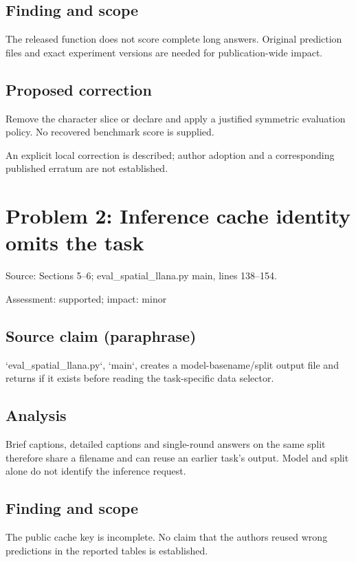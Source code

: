 \documentclass[11pt]{article}
\begin{document}
\subsection*{Finding and scope}

The released function does not score complete long answers. Original prediction files and exact experiment versions are needed for publication-wide impact.

\subsection*{Proposed correction}

Remove the character slice or declare and apply a justified symmetric evaluation policy. No recovered benchmark score is supplied.

An explicit local correction is described; author adoption and a corresponding published erratum are not established.

\section*{Problem 2: Inference cache identity omits the task}

Source: Sections 5–6; eval\_spatial\_llana.py main, lines 138–154.

Assessment: supported; impact: minor

\subsection*{Source claim (paraphrase)}

`eval\_spatial\_llana.py`, `main`, creates a model-basename/split output file and returns if it exists before reading the task-specific data selector.

\subsection*{Analysis}

Brief captions, detailed captions and single-round answers on the same split therefore share a filename and can reuse an earlier task’s output. Model and split alone do not identify the inference request.

\subsection*{Finding and scope}

The public cache key is incomplete. No claim that the authors reused wrong predictions in the reported tables is established.
\end{document}
